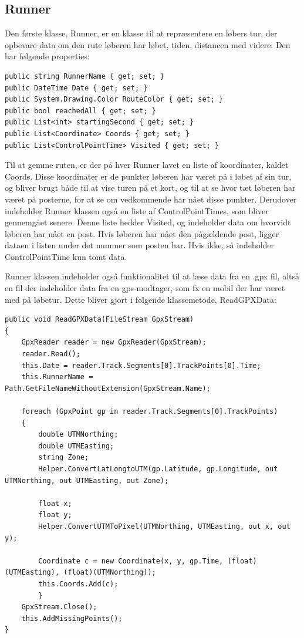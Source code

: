 \subsection{Runner}
Den første klasse, Runner, er en klasse til at repræsentere en løbers tur, der opbevare data om den rute løberen har løbet, tiden, distancen med videre. Den har følgende properties:

\begin{lstlisting}
public string RunnerName { get; set; }
public DateTime Date { get; set; }
public System.Drawing.Color RouteColor { get; set; }
public bool reachedAll { get; set; }
public List<int> startingSecond { get; set; }
public List<Coordinate> Coords { get; set; }
public List<ControlPointTime> Visited { get; set; }
\end{lstlisting}

Til at gemme ruten, er der på hver Runner lavet en liste af koordinater, kaldet Coords.
Disse koordinater er de punkter løberen har været på i løbet af sin tur, og bliver brugt både til at vise turen på et kort, og til at se hvor tæt løberen har været på posterne, for at se om vedkommende har nået disse punkter.
Derudover indeholder Runner klassen også en liste af ControlPointTimes, som bliver gennemgået senere. Denne liste hedder Visited, og indeholder data om hvorvidt løberen har nået en post. Hvis løberen har nået den pågældende post, ligger dataen i listen under det nummer som posten har. Hvis ikke, så indeholder ControlPointTime kun tomt data. 
 

Runner klassen indeholder også funktionalitet til at læse data fra en .gpx fil, altså en fil der indeholder data fra en gps-modtager, som fx en mobil der har været med på løbetur.
Dette bliver gjort i følgende klassemetode, ReadGPXData:


\begin{lstlisting}
public void ReadGPXData(FileStream GpxStream)
{
	GpxReader reader = new GpxReader(GpxStream);
	reader.Read();
	this.Date = reader.Track.Segments[0].TrackPoints[0].Time;
	this.RunnerName = Path.GetFileNameWithoutExtension(GpxStream.Name);

	foreach (GpxPoint gp in reader.Track.Segments[0].TrackPoints)
	{
		double UTMNorthing;
		double UTMEasting;
		string Zone;
        Helper.ConvertLatLongtoUTM(gp.Latitude, gp.Longitude, out UTMNorthing, out UTMEasting, out Zone);

        float x;
        float y;
        Helper.ConvertUTMToPixel(UTMNorthing, UTMEasting, out x, out y);

        Coordinate c = new Coordinate(x, y, gp.Time, (float)(UTMEasting), (float)(UTMNorthing));
        this.Coords.Add(c);
        }
    GpxStream.Close();
    this.AddMissingPoints();
}
\end{lstlisting}

